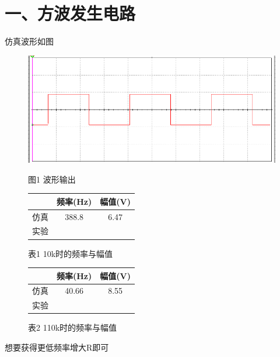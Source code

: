\documentclass[a4paper,10pt,notitlepage]{article}
\begin{document}
	\section*{一、方波发生电路}
		仿真波形如图
		\begin{figure}[h]
			\centering
			\begin{minipage}{0.3\textwidth}
				\centering
				\includegraphics[width=\textwidth]{2.png}
				\caption*{图1 波形输出}
			\end{minipage}
			\qquad
			\begin{minipage}{0.3\textwidth}
				\centering
				\begin{tabular}{|c|c|c|}
					\hline
					 & 频率(Hz) & 幅值(V) \\
					\hline
					仿真 & 388.8 & 6.47 \\
					\hline 
					实验 & \qquad & \qquad  \\
					\hline
				\end{tabular}
				\caption*{表1 10k时的频率与幅值}
			\end{minipage}
			\qquad
			\begin{minipage}{0.3\textwidth}
				\centering
				\begin{tabular}{|c|c|c|}
					\hline
					& 频率(Hz) & 幅值(V) \\
					\hline
					仿真 & 40.66 & 8.55 \\
					\hline 
					实验 & \qquad & \qquad  \\
					\hline
				\end{tabular}
				\caption*{表2 110k时的频率与幅值}
			\end{minipage}
		\end{figure}
		想要获得更低频率增大R即可
\end{document}

